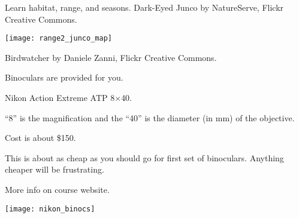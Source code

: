 \documentclass[t]{beamer}
\begin{document}
{
\begin{frame}[b,plain]{Learn habitat, range, and seasons.}
	\tiny\hfill Dark-Eyed Junco by NatureServe, Flickr Creative Commons.
\end{frame}
}

\begin{frame}[b,plain]
	\begin{center}
		\texttt{[image: range2\_junco\_map]}
	\end{center}
\end{frame}

{
\begin{frame}[b,plain]
	\tiny Birdwatcher by Daniele Zanni, Flickr Creative Commons.
\end{frame}
}

{
\begin{frame}[t,plain]{Binoculars are provided for you.}


\begin{multicols}{2}
Nikon Action Extreme ATP 8$\times$40.

\smallskip

“8” is the magnification and the “40” is the diameter (in mm) of the objective.

\smallskip

Cost is about \$150.

\smallskip

This is about as cheap as you should go for first set of binoculars. Anything cheaper will be frustrating.

\smallskip

More info on course website.

\columnbreak

\texttt{[image: nikon\_binocs]}

\end{multicols}
%
%

\end{frame}
}
\end{document}

